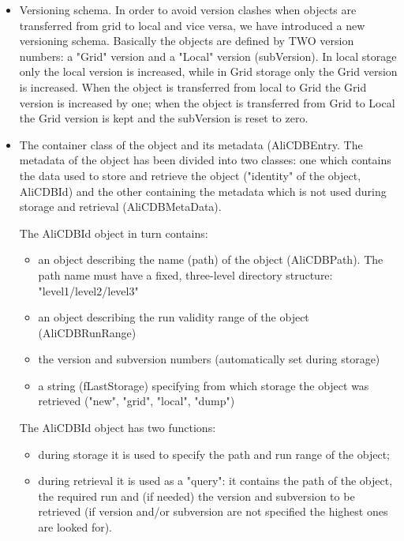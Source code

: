 \documentclass[12pt,a4paper,twoside]{article}
\begin{document}
{\begin{itemize}
\item Versioning schema. In order to avoid version clashes when objects 
  are transferred from grid to local and vice versa, we have introduced a 
  new versioning schema. Basically the objects are defined by TWO version 
  numbers: a "Grid" version and a "Local" version (subVersion). In local 
  storage only the local version is increased, while in Grid storage only 
  the Grid version is increased. When the object is transferred from local 
  to Grid the Grid version is increased by one; when the object is 
  transferred from Grid to Local the Grid version is kept and the subVersion 
  is reset to zero. %
  
\item The container class of the object and its metadata
  (AliCDBEntry. The metadata of the object has been divided into two  
  classes: one which contains the data used to store and retrieve the object 
  ("identity" of the object, AliCDBId) and the other containing the metadata 
  which is not used during storage and retrieval (AliCDBMetaData). 

  The AliCDBId object in turn contains:
  \begin{itemize}
  \item an object describing the name (path) of the object (AliCDBPath). The 
    path name must have a fixed, three-level directory structure: 
    "level1/level2/level3" 
  \item an object describing the run validity range of the object
    (AliCDBRunRange)
  \item the version and subversion numbers (automatically set during storage)
  \item a string (fLastStorage) specifying from which storage the object was 
    retrieved ("new", "grid", "local", "dump")
  \end{itemize}
  
  The AliCDBId object has two functions:
  \begin{itemize}
  \item during storage it is used to specify the path and run range of the 
    object;
  \item during retrieval it is used as a "query": it contains the
    path of the object, the required run and (if needed) the
    version and subversion to be retrieved (if version and/or
    subversion are not specified the highest ones are looked for).
  \end{itemize}
\end{itemize}

}
\end{document}
